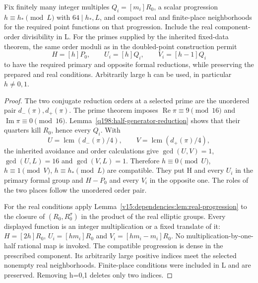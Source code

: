 \begin{lemma}
\label{q198:half-generator-progression}
Fix finitely many integer multiples $Q_i=[m_i]R_0$, a scalar
progression $h\equiv h_*\pmod L$ with $64\mid h_*,L$, and
compact real and finite-place neighborhoods for the required point
functions on that progression. Include the real component-order
divisibility in L. For the primes supplied by the inherited
fixed-data theorem, the same order moduli as in the doubled-point
construction permit
\[
 H=[h]P_0,\qquad U_i=[h]Q_i,\qquad V_i=[h-1]Q_i
\]
to have the required primary and opposite formal reductions,
while preserving the prepared and real conditions. Arbitrarily
large h can be used, in particular $h\ne0,1$.
\end{lemma}
\begin{proof}
The two conjugate reduction orders at a selected prime are the
unordered pair $d_-(\pi),d_+(\pi)$. The prime theorem imposes
$\operatorname{Re}\pi\equiv9\pmod{16}$ and
$\operatorname{Im}\pi\equiv0\pmod{16}$.
Lemma~\ref{q198:half-generator-reduction} shows that their quarters
kill $R_0$, hence every $Q_i$. With
\[
 U=\operatorname{lcm}(d_-(\pi)/4),\qquad
 V=\operatorname{lcm}(d_+(\pi)/4),
\]
the inherited avoidance and order calculations give
$\gcd(U,V)=1$, $\gcd(U,L)=16$ and $\gcd(V,L)=1$.
Therefore
$h\equiv0\pmod U$, $h\equiv1\pmod V$,
$h\equiv h_*\pmod L$ are compatible. They put H and every
$U_i$ in the primary formal group and $H-P_0$ and every $V_i$
in the opposite one. The roles of the two places follow the
unordered order pair.

For the real conditions apply
Lemma~\ref{v15:dependencies:lem:real-progression} to the closure
of $(R_0,R_0^\sigma)$ in the product of the real elliptic groups.
Every displayed function is an integer multiplication or a fixed
translate of it: $H=[2h]R_0$, $U_i=[hm_i]R_0$ and
$V_i=[hm_i-m_i]R_0$. No multiplication-by-one-half rational map
is invoked. The compatible progression is dense in the prescribed
component. Its arbitrarily large positive indices meet the selected
nonempty real neighborhoods. Finite-place conditions were included
in L and are preserved. Removing h=0,1 deletes only two indices.
\end{proof}

